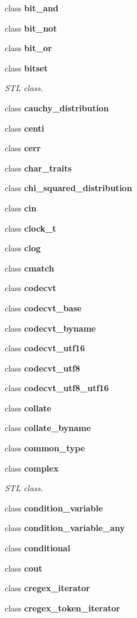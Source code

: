 \begin{DoxyCompactItemize}
class \textbf{ bit\+\_\+and}
\item 
class \textbf{ bit\+\_\+not}
\item 
class \textbf{ bit\+\_\+or}
\item 
class \textbf{ bitset}
\begin{DoxyCompactList}\small\item\em S\+TL class. \end{DoxyCompactList}\item 
class \textbf{ cauchy\+\_\+distribution}
\item 
class \textbf{ centi}
\item 
class \textbf{ cerr}
\item 
class \textbf{ char\+\_\+traits}
\item 
class \textbf{ chi\+\_\+squared\+\_\+distribution}
\item 
class \textbf{ cin}
\item 
class \textbf{ clock\+\_\+t}
\item 
class \textbf{ clog}
\item 
class \textbf{ cmatch}
\item 
class \textbf{ codecvt}
\item 
class \textbf{ codecvt\+\_\+base}
\item 
class \textbf{ codecvt\+\_\+byname}
\item 
class \textbf{ codecvt\+\_\+utf16}
\item 
class \textbf{ codecvt\+\_\+utf8}
\item 
class \textbf{ codecvt\+\_\+utf8\+\_\+utf16}
\item 
class \textbf{ collate}
\item 
class \textbf{ collate\+\_\+byname}
\item 
class \textbf{ common\+\_\+type}
\item 
class \textbf{ complex}
\begin{DoxyCompactList}\small\item\em S\+TL class. \end{DoxyCompactList}\item 
class \textbf{ condition\+\_\+variable}
\item 
class \textbf{ condition\+\_\+variable\+\_\+any}
\item 
class \textbf{ conditional}
\item 
class \textbf{ cout}
\item 
class \textbf{ cregex\+\_\+iterator}
\item 
class \textbf{ cregex\+\_\+token\+\_\+iterator}

\end{DoxyCompactItemize}
